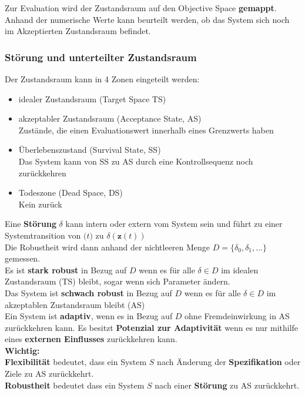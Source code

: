 \documentclass[a4paper]{article}
\begin{document}
Zur Evaluation wird der Zustandsraum auf den Objective Space \textbf{gemappt}. Anhand der numerische Werte kann beurteilt werden, ob das System sich noch im Akzeptierten Zustandsraum befindet.

\subsubsection{Störung und unterteilter Zustandsraum}
Der Zustandsraum kann in 4 Zonen eingeteilt werden:
\begin{itemize}
	\item idealer Zustandsraum (Target Space TS)
	\item akzeptabler Zustandsraum (Acceptance State, AS)\\
	Zustände, die einen Evaluationswert innerhalb eines Grenzwerts haben
	\item Überlebenszustand (Survival State, SS)\\
	Das System kann von SS zu AS durch eine Kontrollsequenz noch zurückkehren
	\item Todeszone (Dead Space, DS)\\
	Kein zurück
\end{itemize}

Eine \textbf{Störung} $\delta$ kann intern oder extern vom System sein und führt zu einer Systemtransition von $\mathbf(t)$ zu $\delta(\mathbf{z}(t))$\\

Die Robustheit wird dann anhand der nichtleeren Menge $D=\{\delta_0, \delta_1,\dots  \}$ gemessen.\\
Es ist \textbf{stark robust} in Bezug auf $D$ wenn es für alle $\delta \in D$ im idealen Zustandsraum (TS) bleibt, sogar wenn sich Parameter ändern.\\
 Das System ist \textbf{schwach robust} in Bezug auf $D$ wenn es für alle $\delta \in D$ im akzeptablen Zustandsraum bleibt (AS)\\
 
 Ein System ist \textbf{adaptiv}, wenn es in Bezug auf $D$ ohne Fremdeinwirkung in AS zurückkehren kann. Es besitzt \textbf{Potenzial zur Adaptivität} wenn es nur mithilfe eines \textbf{externen Einflusses} zurückkehren kann.\\
 
\textbf{ Wichtig:}\\
\textbf{Flexibilität} bedeutet, dass ein System $S$ nach Änderung der \textbf{Spezifikation} oder Ziele zu AS zurückkehrt.\\
\textbf{Robustheit} bedeutet dass ein System $S$ nach einer \textbf{Störung} zu AS zurückkehrt.
\end{document}
